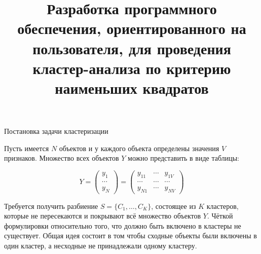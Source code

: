 \documentclass[aspectratio=169,tikz]{beamer}
\title{Разработка программного обеспечения, ориентированного на пользователя, для проведения кластер-анализа по критерию наименьших квадратов}
\author[Еремейкин П.А. \& Миркин Б.Г.]{
	\texorpdfstring{
	\begin{columns}
		\column{.45\linewidth}
		\raggedleft
		\begin{flushleft}
			Выполнил:\\
			Еремейкин Пётр Александрович\\
			студент группы мНоД16-ТМСС\\
			\href{mailto:eremeykin@gmail.com}{\texttt{eremeykin@gmail.com}}
		\end{flushleft}
		\column{.45\linewidth}
		\begin{flushright}
			Руководитель:\\
			Миркин Борис Григорьевич\\
			д.т.н., профессор\\
			\vspace*{1\baselineskip} 
		\end{flushright}
	\end{columns}
	}
	{Еремейкин \& Миркин}
}
\institute{\vspace{1cm} НИУ ВШЭ\\Июнь 2018}
\date{}
\begin{document}
	\usetikzlibrary{shapes,backgrounds}
	\usetikzlibrary{arrows.meta}
	\usetikzlibrary{snakes}
	
	\begin{frame}
		\titlepage
	\end{frame}
	
	\begin{frame}{Постановка задачи кластеризации}
		\parbox{\linewidth}{
				Пусть имеется $ N $ объектов и у каждого объекта определены значения $ V $ признаков. Множество всех объектов $ Y $ можно представить в виде таблицы:
			}
		\begin{equation*}
			Y= \begin{pmatrix} 
			y_{1} \\
			\cdots \\ 
			y_{N} 
			\end{pmatrix}
			= \begin{pmatrix} 
			y_{11} & \cdots  & y_{1V} \\ 
			\cdots & \cdots  & \cdots \\ 
			y_{N1} & \cdots  & y_{NV} 
			\end{pmatrix}
		\end{equation*}
		\parbox{\linewidth}{
			Требуется получить разбиение $ S = \{C_1,\ldots,C_K\} $, состоящее из $ K $ кластеров, которые не пересекаются и 	покрывают всё множество объектов $ Y $. Чёткой формулировки относительно того, что должно быть включено в кластеры не существует.  Общая идея состоит в том чтобы сходные объекты были включены в один кластер, а несходные не принадлежали одному кластеру.
		}

		
	\end{frame}
	
\end{document}
